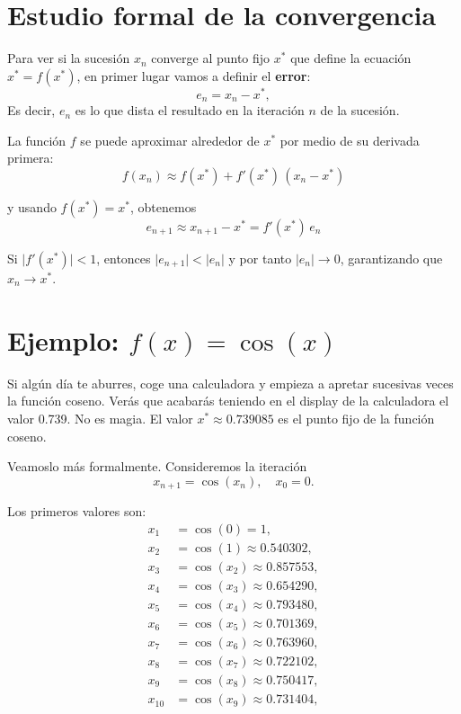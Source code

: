 \documentclass[
  11pt,
  a4paper,
  DIV=11,
  numbers=noendperiod]{scrreprt}
\begin{document}
\section{Estudio formal de la
convergencia}\label{estudio-formal-de-la-convergencia}

Para ver si la sucesión \(x_n\) converge al punto fijo \(x^*\) que
define la ecuación \(x^* = f(x^*)\), en primer lugar vamos a definir el
\textbf{error}: \[
e_n = x_n - x^*,
\] Es decir, \(e_n\) es lo que dista el resultado en la iteración \(n\)
de la sucesión.

La función \(f\) se puede aproximar alrededor de \(x^*\) por medio de su
derivada primera: \[
f(x_n) \approx f(x^*) + f'(x^*)\,(x_n - x^*) 
\]

y usando \(f(x^*)=x^*\), obtenemos \[
e_{n+1} \approx x_{n+1} - x^* = f'(x^*)\,e_n 
\]

Si \(\lvert f'(x^*)\rvert < 1\), entonces
\(\lvert e_{n+1}\rvert < \lvert e_n\rvert\) y por tanto
\(\lvert e_n\rvert\to0\), garantizando que \(x_n\to x^*\).

\section{\texorpdfstring{Ejemplo:
\(f(x)=\cos(x)\)}{Ejemplo: f(x)=\textbackslash cos(x)}}\label{ejemplo-fxcosx}

Si algún día te aburres, coge una calculadora y empieza a apretar
sucesivas veces la función coseno. Verás que acabarás teniendo en el
display de la calculadora el valor 0.739. No es magia. El valor
\(x^* \approx 0.739085\) es el punto fijo de la función coseno.

Veamoslo más formalmente. Consideremos la iteración \[
x_{n+1} = \cos(x_n), \quad x_0 = 0.
\]

Los primeros valores son: \[
\begin{align*}
x_1 &= \cos(0)=1,\\
x_2 &= \cos(1)\approx0.540302,\\
x_3 &= \cos(x_2)\approx0.857553,\\
x_4 &= \cos(x_3)\approx0.654290,\\
x_5 &= \cos(x_4)\approx0.793480,\\
x_6 &= \cos(x_5)\approx0.701369,\\
x_7 &= \cos(x_6)\approx0.763960,\\
x_8 &= \cos(x_7)\approx0.722102,\\
x_9 &= \cos(x_8)\approx0.750417,\\
x_{10} &= \cos(x_9)\approx0.731404,\\
\end{align*}
\]
\end{document}
